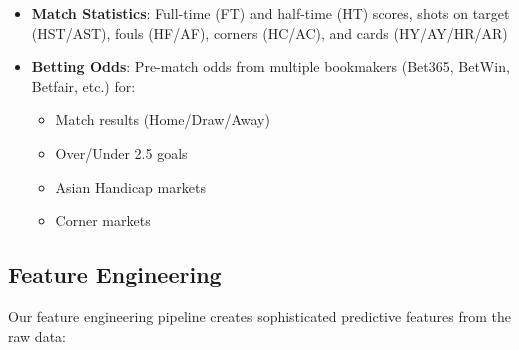 \documentclass[conference]{IEEEtran}
\begin{document}
\begin{itemize}
    \item \textbf{Match Statistics}: Full-time (FT) and half-time (HT) scores, shots on target (HST/AST), fouls (HF/AF), corners (HC/AC), and cards (HY/AY/HR/AR)
    \item \textbf{Betting Odds}: Pre-match odds from multiple bookmakers (Bet365, BetWin, Betfair, etc.) for:
        \begin{itemize}
            \item Match results (Home/Draw/Away)
            \item Over/Under 2.5 goals
            \item Asian Handicap markets
            \item Corner markets
        \end{itemize}
\end{itemize}

\subsection{Feature Engineering}
Our feature engineering pipeline creates sophisticated predictive features from the raw data:
\end{document}
